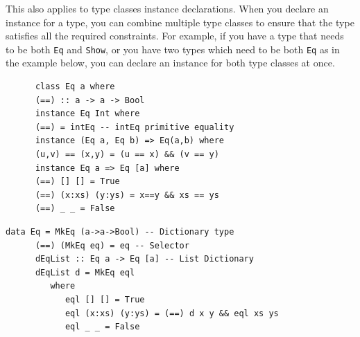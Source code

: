 This also applies to type classes instance declarations.
When you declare an instance for a type, you can combine multiple type classes to ensure that the type satisfies all the required constraints. For example, if you have a type that needs to be both \lstinline|Eq| and \lstinline|Show|, or you have two types which need to be both \lstinline|Eq| as in the example below, you can declare an instance for both type classes at once.
\begin{paracol}{2}
   \begin{lstlisting}
      class Eq a where
      (==) :: a -> a -> Bool
      instance Eq Int where
      (==) = intEq -- intEq primitive equality
      instance (Eq a, Eq b) => Eq(a,b) where
      (u,v) == (x,y) = (u == x) && (v == y)
      instance Eq a => Eq [a] where
      (==) [] [] = True
      (==) (x:xs) (y:ys) = x==y && xs == ys
      (==) _ _ = False
   \end{lstlisting}
   
   \switchcolumn

   \begin{lstlisting}[caption={This is what it looks like after the compiler has rewritten the code}]
      data Eq = MkEq (a->a->Bool) -- Dictionary type
      (==) (MkEq eq) = eq -- Selector
      dEqList :: Eq a -> Eq [a] -- List Dictionary
      dEqList d = MkEq eql
         where
            eql [] [] = True
            eql (x:xs) (y:ys) = (==) d x y && eql xs ys
            eql _ _ = False
   \end{lstlisting}
\end{paracol}

\newpage
